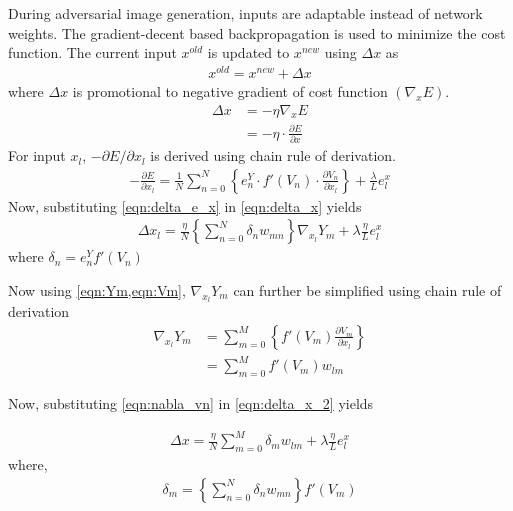 \begin{appendices}
        During adversarial image generation, inputs are adaptable instead of network weights. The gradient-decent based backpropagation is used to minimize the cost function. The current input $x^{old}$ is updated to $x^{new}$ using $\Delta x$ as 
        \begin{align} \label{eqn:update_rule}
            x^{old} = x^{new} + \Delta x
        \end{align}
        where $\Delta x$ is promotional to negative gradient of cost function $(\nabla_{x}E)$.
        \begin{align} \label{eqn:delta_x}
            \Delta x &= - \eta \nabla_{x} E \nonumber \\ 
                     &= - \eta \cdot \frac{\partial E}{\partial x}
        \end{align}
        For input $x_{l}$, $- \partial E / \partial x_{l}$ is derived using chain rule of derivation.
        \begin{align} \label{eqn:delta_e_x}
            - \frac{\partial E }{\partial x_{l}} = \frac{1}{N} \sum \limits_{n=0}^{N} \left\{ e_n^Y \cdot f'(V_n) \cdot \frac{\partial V_n}{\partial x_l} \right\} + \frac{\lambda}{L} e_l^x
        \end{align}
        Now, substituting \cref{eqn:delta_e_x} in \cref{eqn:delta_x} yields 
        \begin{align} \label{eqn:delta_x_2}
            \Delta x_l  = \frac{\eta}{N} \left\{ \sum \limits_{n=0}^{N} \delta_{n} w_{mn} \right\} \nabla_{x_l} Y_m + \lambda \frac{\eta}{L} e_l^x
        \end{align}
        where $\delta_{n} = e_n^Y f'(V_n)$

        Now using \cref{eqn:Ym,eqn:Vm}, $\nabla_{x_l} Y_m$ can further be simplified using chain rule of derivation
        \begin{align} \label{eqn:nabla_vn}
            \nabla_{x_l} Y_m &= \sum \limits_{m=0}^{M} \left\{ f'(V_m) \frac{\partial V_m}{\partial x_l} \right\} \nonumber \\
            &= \sum \limits_{m=0}^{M} f'(V_m) w_{lm}
        \end{align}
        
        Now, substituting \cref{eqn:nabla_vn} in \cref{eqn:delta_x_2} yields

        \begin{align} \label{eqn:final_learning_eqn}
            \Delta x= \frac{\eta}{N} \sum \limits_{m=0}^{M} \delta_{m} w_{lm} + \lambda \frac{\eta}{L} e_l^x
        \end{align}
        where,
        \begin{align}
            \delta_{m} = \left\{ \sum \limits_{n=0}^{N} \delta_{n} w_{mn} \right\} f'(V_m) \nonumber
        \end{align}      

\end{appendices}